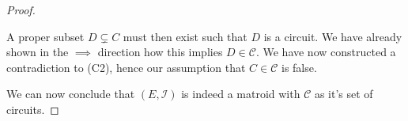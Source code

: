 \begin{proof}
\begin{enumerate}
  A proper subset $D  \subsetneq C$ must then exist such that $D$ is a circuit. We have already shown in the $\implies$ direction how this implies $D \in \mathcal{C}$. We have now constructed a contradiction to (C2), hence our assumption that $C \in \mathcal C$ is false.

\end{enumerate}



  We can now conclude that $(E, \mathcal I)$ is indeed a matroid with $\mathcal C$ as it's set of circuits.
\end{proof}

\begin{exmp}
    
\end{exmp}

